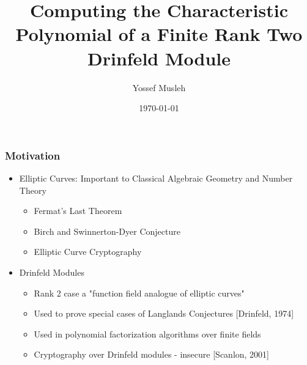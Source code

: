\documentclass{beamer}
\title[master talk]{Computing the Characteristic Polynomial of a Finite Rank Two Drinfeld Module} %
\author{Yossef Musleh} %
\institute[UW] %
{
University of Waterloo \\ %
\medskip
\textit{ymusleh@uwaterloo.ca} %
}
\date{\today} %
\begin{document}
\begin{frame}
\titlepage %
\end{frame}



\begin{frame}
\frametitle{Motivation}

\begin{itemize}

\item  Elliptic Curves: Important to Classical Algebraic Geometry and Number Theory

\begin{itemize}
    \item Fermat's Last Theorem
    \item Birch and Swinnerton-Dyer Conjecture
    \item Elliptic Curve Cryptography
    
\end{itemize}

\item Drinfeld Modules
\begin{itemize}
\item Rank 2 case a "function field analogue of elliptic curves"
    \item Used to prove special cases of Langlands Conjectures [Drinfeld, 1974]
    \item Used in polynomial factorization algorithms over finite fields
    
 
    \item Cryptography over Drinfeld modules - insecure [Scanlon, 2001]
\end{itemize}
  
  
  
  
\end{itemize}

\end{frame}
\end{document}
